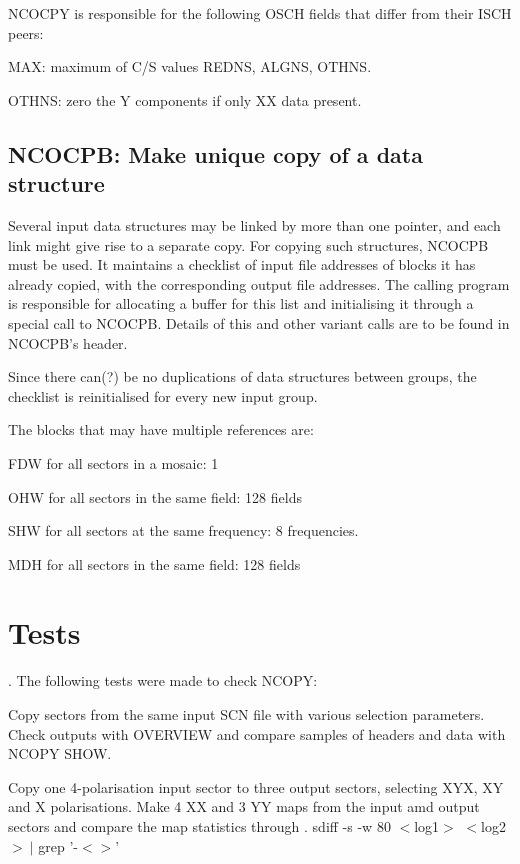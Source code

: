 	NCOCPY is responsible for the following OSCH fields that differ from
their ISCH peers:
\bi
\item   MAX: maximum of C/S values REDNS, ALGNS, OTHNS.

\item   OTHNS: zero the Y components if only XX data present.
\ei

\subsection{ NCOCPB: Make unique copy of a data structure }

	Several input data structures may be linked by more than one pointer,
and each link might give rise to a separate copy. For copying such structures,
NCOCPB must be used. It maintains a checklist of input file addresses of blocks
it has already copied, with the corresponding output file addresses. The
calling program is responsible for allocating a buffer for this list and
initialising it through a special call to NCOCPB. Details of this and other
variant calls are to be found in NCOCPB's header.

	Since there can(?) be no duplications of data structures between
groups, the checklist is reinitialised for every new input group.

	The blocks that may have multiple references are:
\bi
\item   FDW for all sectors in a mosaic: 1
\item   OHW for all sectors in the same field: 128 fields
\item   SHW for all sectors at the same frequency: 8 frequencies.
\item   MDH for all sectors in the same field: 128 fields
\ei


\section{ Tests }

.       The following tests were made to check NCOPY:
\bi
\item   Copy sectors from the same input SCN file with various selection
parameters. Check outputs with OVERVIEW and compare samples of headers and data
with NCOPY SHOW.

\item   Copy one 4-polarisation input sector to three output sectors, selecting
XYX, XY and X polarisations. Make 4 XX and 3 YY maps from the input amd output
sectors and compare the map statistics through
.
	{\sf sdiff -s -w 80 $<$log1$>$ $<$log2$>\ |$ grep '-$<>$'}
\ei

